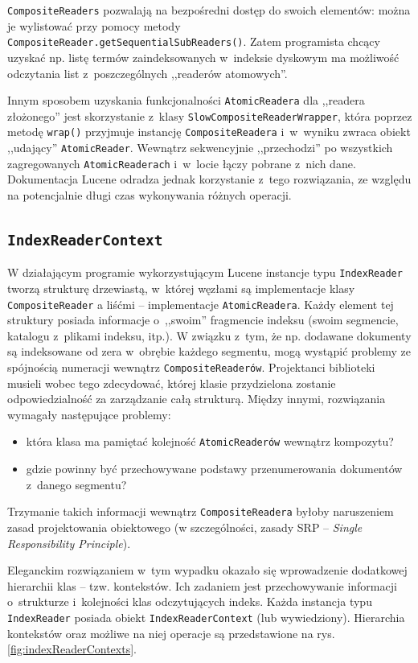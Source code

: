 \texttt{CompositeReaders} pozwalają na bezpośredni dostęp do swoich elementów: można je wylistować przy pomocy metody \texttt{CompositeReader.getSequentialSubReaders()}. Zatem programista chcący uzyskać np. listę termów zaindeksowanych w~indeksie dyskowym ma możliwość odczytania list z~poszczególnych ,,readerów atomowych''.

Innym sposobem uzyskania funkcjonalności \texttt{AtomicReadera} dla ,,readera złożonego'' jest skorzystanie z~klasy \texttt{SlowCompositeReaderWrapper}, która poprzez metodę \texttt{wrap()} przyjmuje instancję \texttt{CompositeReadera} i~w~wyniku zwraca obiekt ,,udający'' \texttt{AtomicReader}. Wewnątrz sekwencyjnie ,,przechodzi'' po wszystkich zagregowanych \texttt{AtomicReaderach} i~w~locie łączy pobrane z~nich dane. Dokumentacja Lucene odradza jednak korzystanie z~tego rozwiązania, ze względu na potencjalnie długi czas wykonywania różnych operacji.

\subsection{\texttt{IndexReaderContext}}

W działającym programie wykorzystującym Lucene instancje typu \texttt{IndexReader} tworzą strukturę drzewiastą, w~której węzłami są implementacje klasy \texttt{CompositeReader} a liśćmi -- implementacje \texttt {AtomicReadera}. Każdy element tej struktury posiada informacje o~,,swoim'' fragmencie indeksu (swoim segmencie, katalogu z~plikami indeksu, itp.). W związku z~tym, że np. dodawane dokumenty są indeksowane od zera w~obrębie każdego segmentu, mogą wystąpić problemy ze spójnością numeracji wewnątrz \texttt{CompositeReaderów}. Projektanci biblioteki musieli wobec tego zdecydować, której klasie przydzielona zostanie odpowiedzialność za zarządzanie całą strukturą. Między innymi, rozwiązania wymagały następujące problemy: 
\begin{itemize}  
 \item która klasa ma pamiętać kolejność \texttt{AtomicReaderów} wewnątrz kompozytu?
 \item gdzie powinny być przechowywane podstawy przenumerowania dokumentów z~danego segmentu?
\end{itemize}
Trzymanie takich informacji wewnątrz \texttt{CompositeReadera} byłoby naruszeniem zasad projektowania obiektowego (w szczególności, zasady SRP -- \emph{Single Responsibility Principle}).

Eleganckim rozwiązaniem w~tym wypadku okazało się wprowadzenie dodatkowej hierarchii klas -- tzw. kontekstów. Ich zadaniem jest przechowywanie informacji o~strukturze i~kolejności klas odczytujących indeks. Każda instancja typu \texttt{IndexReader} posiada obiekt \texttt{IndexReaderContext} (lub wywiedziony). Hierarchia kontekstów oraz możliwe na niej operacje są przedstawione na rys. \ref{fig:indexReaderContexts}. 

